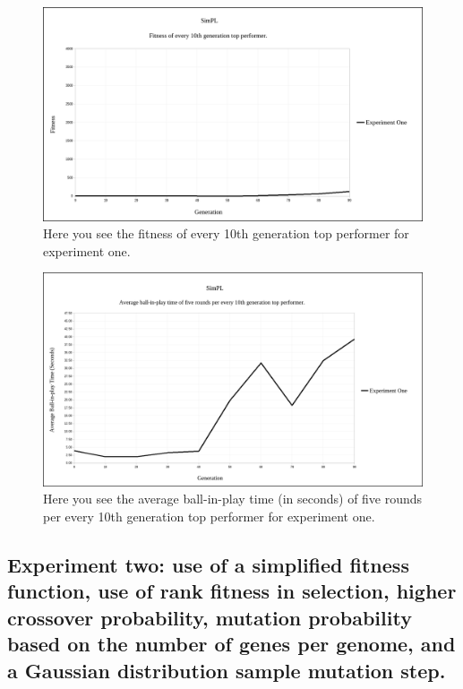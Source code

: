 \documentclass[a4paper,10pt]{article}
\begin{document}
\begin{figure}[H]  
  \centering
  \includegraphics[width=1\textwidth]{figures/exp1_10_tops.png}
  \caption{Here you see the fitness of every 10th generation top performer for experiment one.}
  \label{fig:exp1_10_tops}
\end{figure}

\begin{figure}[H]  
  \centering
  \includegraphics[width=1\textwidth]{figures/exp1_10_tops_times.png}
  \caption{Here you see the average ball-in-play time (in seconds) of five rounds per every 10th generation top performer for experiment one.}
  \label{fig:exp1_10_tops_times}
\end{figure}

\subsection{Experiment two: use of a simplified fitness function, use of rank fitness in selection, higher crossover probability, mutation probability based on the number of genes per genome, and a Gaussian distribution sample mutation step.}
\end{document}
